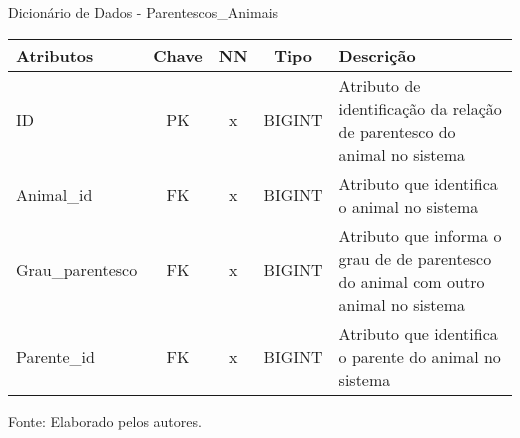 \documentclass[
    12pt,               %
    openright,          %
    oneside,
    a4paper,            %
    BIBLATEX,           %
    TODO,               %
    english,            %
    brazil              %
    ]{ifsp-spo-inf-ctds}
\begin{document}
    \begin{center}
        \begin{quadro}[H]
        \centering
                \caption{Dicionário de Dados - Parentescos\_Animais}
                  \begin{tabulary}{1.0\textwidth}{|p{9em}|c|c|c|p{19em}|}
            \hline
            Atributos & Chave & NN & Tipo & Descrição\\
            \hline
            ID & PK & x & BIGINT & Atributo de identificação da relação de parentesco do animal no sistema \\
            \hline
            Animal\_id & FK & x & BIGINT & Atributo que identifica o animal no sistema\\
            \hline
            Grau\_parentesco & FK & x & BIGINT & Atributo que informa o grau de de parentesco do animal com outro animal no sistema\\
            \hline
            Parente\_id & FK & x & BIGINT & Atributo que identifica o parente do animal no sistema\\
            \hline
            \end{tabulary}

                \label{qd: md-parentesco-animal}
                \centering
        {\footnotesize Fonte: Elaborado pelos autores.}
              \end{quadro}
            \end{center}    
\end{document}
